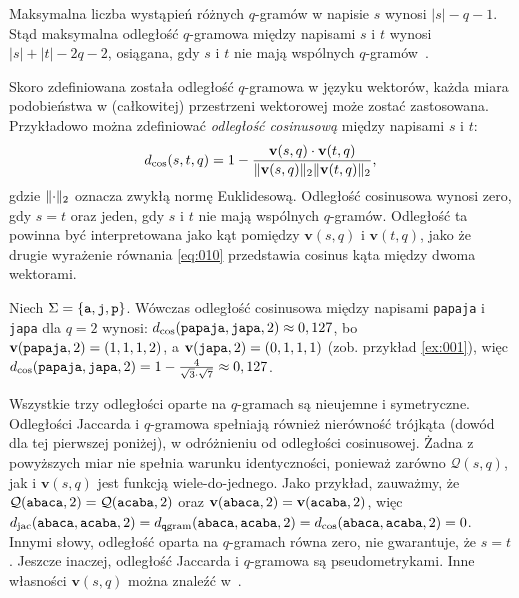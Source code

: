 \documentclass{praca1}
\DeclarePairedDelimiter{\norm}{\lVert}{\rVert}
\begin{document}

Maksymalna liczba wystąpień różnych $q$-gramów w napisie $s$ wynosi $|s| - q - 1$. Stąd maksymalna odległość $q$-gramowa między napisami $s$ i $t$ wynosi $|s| + |t| - 2q - 2$, osiągana, gdy $s$ i $t$ nie mają wspólnych $q$-gramów~\cite{Loo2014:stringdist}.

Skoro zdefiniowana została odległość $q$-gramowa w języku wektorów, każda miara podobieństwa w (całkowitej) przestrzeni wektorowej może zostać zastosowana. Przykładowo można zdefiniować \emph{odległość cosinusową} między napisami $s$ i $t$:
\begin{equation}
\label{eq:010}
d_{\mathrm{cos}}(s,t,q) = 1 - \frac{ \mathbf{v}(s,q) \cdot \mathbf{v}(t,q) }{ \norm{\mathbf{v}(s,q)}_2  \norm{\mathbf{v}(t,q)}_2 },
\end{equation}
gdzie $\norm{\cdot}_2$ oznacza zwykłą normę Euklidesową. Odległość cosinusowa wynosi zero, gdy $s=t$ oraz jeden, gdy $s$ i $t$ nie mają wspólnych $q$-gramów. Odległość ta powinna być interpretowana jako kąt pomiędzy $\mathbf{v}(s,q)$ i $\mathbf{v}(t,q)$, jako że drugie wyrażenie równania \eqref{eq:010} przedstawia cosinus kąta między dwoma wektorami.

\begin{example}
Niech $\Sigma = \{\verb|a|, \verb|j|, \verb|p|\}$. Wówczas odległość cosinusowa między napisami \verb|papaja| i \verb|japa| dla $q = 2$ wynosi: $d_{\mathrm{cos}}(\verb|papaja|, \verb|japa|, 2) \approx 0,127$, bo $\mathbf{v}( \verb|papaja|,2) = (1, 1, 1, 2)$, a  $\mathbf{v}( \verb|japa|,2) = (0, 1, 1, 1)$ (zob. przykład \ref{ex:001}), więc $d_{\mathrm{cos}}(\verb|papaja|, \verb|japa|, 2) = 1 - \frac{4}{\sqrt{3}\cdot\sqrt{7}} \approx 0,127$.
\end{example}

Wszystkie trzy odległości oparte na $q$-gramach są nieujemne i symetryczne. Odległości Jaccarda i $q$-gramowa spełniają również nierówność trójkąta (dowód dla tej pierwszej poniżej), w odróżnieniu od odległości cosinusowej. Żadna z powyższych miar nie spełnia warunku identyczności, ponieważ zarówno $\mathcal{Q}(s,q)$, jak i $\mathbf{v}(s,q)$ jest funkcją wiele-do-jednego. Jako przykład, zauważmy, że $\mathcal{Q}(\verb|abaca|,2) = \mathcal{Q}(\verb|acaba|,2)$ oraz $\mathbf{v}(\verb|abaca|,2) = \mathbf{v}(\verb|acaba|,2)$, więc $d_{\mathrm{jac}}(\verb|abaca|, \verb|acaba|, 2) = d_{\mathtt{q}\mathrm{gram}}(\verb|abaca|, \verb|acaba|, 2) = d_{\mathrm{cos}}(\verb|abaca|, \verb|acaba|, 2) = 0$. Innymi słowy, odległość oparta na $q$-gramach równa zero, nie gwarantuje, że $s = t$. Jeszcze inaczej, odległość Jaccarda i $q$-gramowa są pseudometrykami. Inne własności $\mathbf{v}(s,q)$ można znaleźć w~\cite{Ukkonen1992:approxqgrams}.
\end{document}
